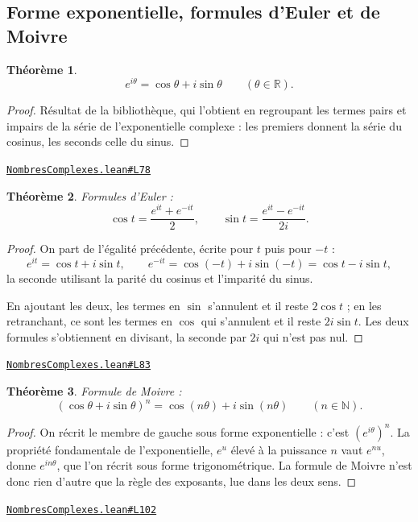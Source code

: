 \documentclass[11pt,a4paper]{article}
\theoremstyle{definition}
\theoremstyle{plain}
\newtheorem{theoreme}{Théorème}
\newcommand{\source}[2]{\par\smallskip\noindent\hfill{\footnotesize\href{#1}{\texttt{#2}}}\par\smallskip}
\begin{document}
\subsection{Forme exponentielle, formules d'Euler et de Moivre}

\begin{theoreme}
\[ e^{i\theta} = \cos\theta + i\sin\theta \qquad (\theta \in \mathbb{R}) . \]
\end{theoreme}

\begin{proof}
Résultat de la bibliothèque, qui l'obtient en regroupant les termes pairs et impairs de la
série de l'exponentielle complexe : les premiers donnent la série du cosinus, les seconds
celle du sinus.
\end{proof}
\source{https://github.com/Commutator-IO/learn-lean/blob/main/cours/02-lycee/07-nombres-complexes/NombresComplexes.lean\#L78}{NombresComplexes.lean\#L78}

\begin{theoreme}
Formules d'Euler :
\[ \cos t = \frac{e^{it} + e^{-it}}{2} , \qquad
   \sin t = \frac{e^{it} - e^{-it}}{2i} . \]
\end{theoreme}

\begin{proof}
On part de l'égalité précédente, écrite pour $t$ puis pour $-t$ :
\[ e^{it} = \cos t + i\sin t , \qquad
   e^{-it} = \cos(-t) + i\sin(-t) = \cos t - i\sin t , \]
la seconde utilisant la parité du cosinus et l'imparité du sinus.

En ajoutant les deux, les termes en $\sin$ s'annulent et il reste $2\cos t$ ; en les
retranchant, ce sont les termes en $\cos$ qui s'annulent et il reste $2i\sin t$. Les deux
formules s'obtiennent en divisant, la seconde par $2i$ qui n'est pas nul.
\end{proof}
\source{https://github.com/Commutator-IO/learn-lean/blob/main/cours/02-lycee/07-nombres-complexes/NombresComplexes.lean\#L83}{NombresComplexes.lean\#L83}

\begin{theoreme}
Formule de Moivre :
\[ (\cos\theta + i\sin\theta)^{n} = \cos(n\theta) + i\sin(n\theta) \qquad (n \in \mathbb{N}) . \]
\end{theoreme}

\begin{proof}
On récrit le membre de gauche sous forme exponentielle : c'est $(e^{i\theta})^{n}$. La
propriété fondamentale de l'exponentielle, $e^{u}$ élevé à la puissance $n$ vaut $e^{nu}$,
donne $e^{i n\theta}$, que l'on récrit sous forme trigonométrique. La formule de Moivre
n'est donc rien d'autre que la règle des exposants, lue dans les deux sens.
\end{proof}
\source{https://github.com/Commutator-IO/learn-lean/blob/main/cours/02-lycee/07-nombres-complexes/NombresComplexes.lean\#L102}{NombresComplexes.lean\#L102}
\end{document}
